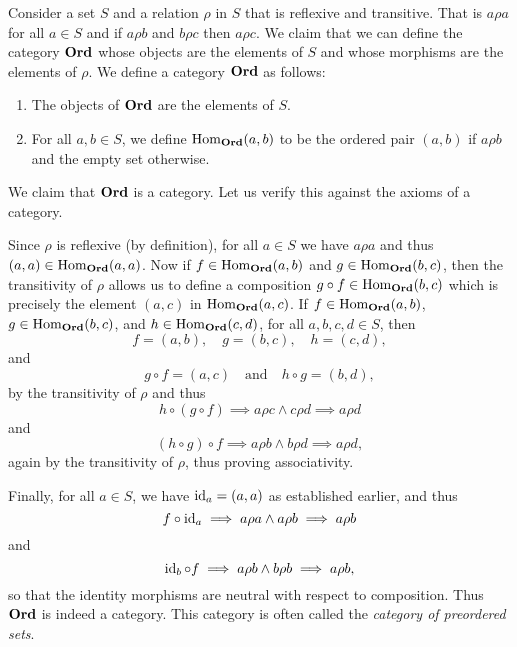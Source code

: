 \begin{example}
    \label{ex:category-preordered-sets}
    Consider a set \(S\) and a relation \(\rho\) in \(S\) that is reflexive and
    transitive. That is \(a\rho a\) for all \(a \in S\) and if \(a\rho b\) and
    \(b\rho c\) then \(a\rho c\). We claim that we can define the category
    \(\mathbf{Ord}\) whose objects are the elements of \(S\) and whose morphisms
    are the elements of \(\rho\). We define a category \(\mathbf{Ord}\) as
    follows:
    \begin{enumerate}[label=(\alph*), itemsep=0pt]
        \item The objects of \(\mathbf{Ord}\) are the elements of \(S\).
        \item For all \(a, b \in S\), we define \(\operatorname{Hom}_{\mathbf{Ord}}(a, b)\) to
        be the ordered pair \((a, b)\) if \(a\rho b\) and the empty set
        otherwise.
    \end{enumerate}
    We claim that \(\mathbf{Ord}\) is a category. Let us verify this against the
    axioms of a category.

    Since \(\rho\) is reflexive (by definition), for all \(a \in S\) we have
    \(a\rho a\) and thus \((a, a) \in \operatorname{Hom}_{\mathbf{Ord}}(a, a)\). Now if \(f \in
    \operatorname{Hom}_{\mathbf{Ord}}(a, b)\) and \(g \in \operatorname{Hom}_{\mathbf{Ord}}(b, c)\), then the
    transitivity of \(\rho\) allows us to define a composition \(g \circ f \in
    \operatorname{Hom}_{\mathbf{Ord}}(b, c)\) which is precisely the element \((a, c)\) in
    \(\operatorname{Hom}_{\mathbf{Ord}}(a, c)\). If \(f \in \operatorname{Hom}_{\mathbf{Ord}}(a, b)\), \(g \in
    \operatorname{Hom}_{\mathbf{Ord}}(b, c)\), and \(h \in \operatorname{Hom}_{\mathbf{Ord}}(c, d)\), for all
    \(a, b, c, d \in S\), then 
    \[
        f = (a, b), \quad g = (b, c), \quad h = (c, d),
    \]
    and
    \[
        g \circ f = (a, c)\quad \text{and}\quad h \circ g = (b, d),
    \]
    by the transitivity of \(\rho\) and thus
    \[
        h \circ (g \circ f) \implies a \rho c \land c \rho d \implies a \rho d
    \]
    and
    \[
        (h \circ g) \circ f \implies a \rho b \land b \rho d \implies a \rho d,
    \]
    again by the transitivity of \(\rho\), thus proving associativity.

    Finally, for all \(a \in S\), we have \(\operatorname{id}_a = (a, a)\) as established
    earlier, and thus
    \[
        f \circ \operatorname{id}_a \implies a \rho a \land a \rho b \implies a \rho b
    \]
    and
    \[
        \operatorname{id}_b \circ f \implies a \rho b \land b \rho b \implies a \rho b,
    \]
    so that the identity morphisms are neutral with respect to composition. Thus
    \(\mathbf{Ord}\) is indeed a category. This category is often called the
    \emph{category of preordered sets}.


\end{example}
